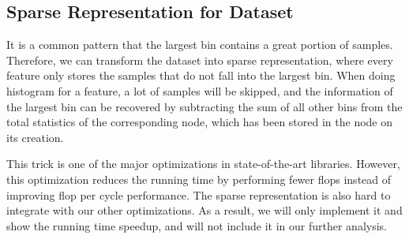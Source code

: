 \subsection{Sparse Representation for Dataset}
It is a common pattern that the largest bin contains a great portion of samples. Therefore, we can transform the dataset into sparse representation, where every feature only stores the samples that do not fall into the largest bin. When doing histogram \update for a feature, a lot of samples will be skipped, and the information of the largest bin can be recovered by subtracting the sum of all other bins from the total statistics of the corresponding node, which has been stored in the node on its creation. 

This trick is one of the major optimizations in state-of-the-art libraries. However, this optimization reduces the running time by performing fewer flops instead of improving flop per cycle performance. The sparse representation is also hard to integrate with our other optimizations. As a result, we will only implement it and show the running time speedup, and will not include it in our further analysis.